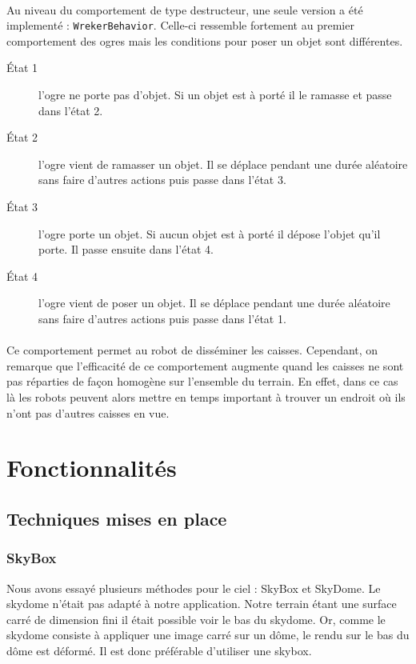 \paragraph{}Au niveau du comportement de type destructeur, une seule version a
été implementé : \texttt{WrekerBehavior}. Celle-ci ressemble fortement au premier comportement des
ogres mais les conditions pour poser un objet sont différentes.

\begin{description}
    \item[\'Etat 1] l'ogre ne porte pas d'objet. Si un objet est à porté il
        le ramasse et passe dans l'état 2.
    \item[\'Etat 2] l'ogre vient de ramasser un objet. Il se déplace pendant une
        durée aléatoire sans faire d'autres actions puis passe dans l'état 3.
    \item[\'Etat 3] l'ogre porte un objet. Si aucun objet est à porté il
        dépose l'objet qu'il porte. Il passe ensuite dans
        l'état 4.
    \item[\'Etat 4] l'ogre vient de poser un objet. Il se déplace pendant une
        durée aléatoire sans faire d'autres actions puis passe dans l'état 1.
\end{description}

\paragraph{}Ce comportement permet au robot de disséminer les caisses.
Cependant, on remarque que l'efficacité de ce comportement augmente quand les
caisses ne sont pas réparties de façon homogène sur l'ensemble du terrain. En
effet, dans ce cas là les robots peuvent alors mettre en temps important à
trouver un endroit où ils n'ont pas d'autres caisses en vue.

\section{Fonctionnalités}


\subsection{Techniques mises en place}
\subsubsection{SkyBox}
Nous avons essayé plusieurs méthodes pour le ciel : SkyBox et SkyDome. Le
skydome n'était pas adapté à notre application. Notre terrain étant une
surface carré de dimension fini il était possible voir le bas du skydome.
Or, comme le skydome consiste à appliquer une image carré sur un dôme, le
rendu sur le bas du dôme est déformé. Il est donc préférable d'utiliser une
skybox.

